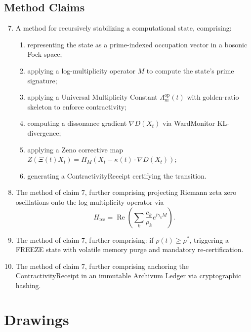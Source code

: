\documentclass[12pt]{article}
\theoremstyle{plain}
\theoremstyle{definition}
\theoremstyle{remark}
\begin{document}
\subsection{Method Claims}

\begin{enumerate}
    \setcounter{enumi}{6}
    \item A method for recursively stabilizing a computational state, comprising:
    \begin{enumerate}
        \item representing the state as a prime-indexed occupation vector in a bosonic Fock space;
        \item applying a log-multiplicity operator $M$ to compute the state's prime signature;
        \item applying a Universal Multiplicity Constant $\Lambda_m^{\text{op}}(t)$ with golden-ratio skeleton to enforce contractivity;
        \item computing a dissonance gradient $\nabla D(X_t)$ via WardMonitor KL-divergence;
        \item applying a Zeno corrective map $Z(\Xi(t)X_t) = \Pi_M(X_t - \kappa(t)\cdot \nabla D(X_t))$;
        \item generating a ContractivityReceipt certifying the transition.
    \end{enumerate}

    \item The method of claim 7, further comprising projecting Riemann zeta zero oscillations onto the log-multiplicity operator via
    \[
    H_{\text{res}} = \operatorname{Re}\left( \sum_{k} \frac{c_k}{\rho_k} e^{i\gamma_k M} \right).
    \]

    \item The method of claim 7, further comprising: if $\rho(t) \geq \rho^*$, triggering a FREEZE state with volatile memory purge and mandatory re-certification.

    \item The method of claim 7, further comprising anchoring the ContractivityReceipt in an immutable Archivum Ledger via cryptographic hashing.
\end{enumerate}

\section{Drawings}
\end{document}
